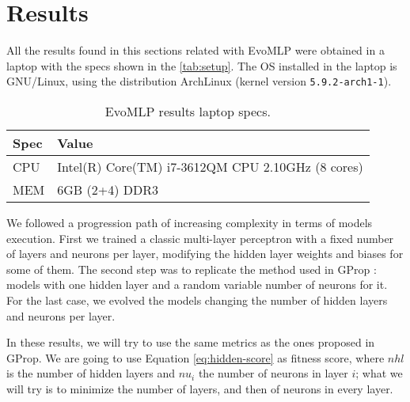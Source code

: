 \documentclass[runningheads]{llncs}
\begin{document}
\section{Results}
\label{sec:res}


All the results found in this sections related with {\sf EvoMLP}
\cite{deep-g-prop:anon} were obtained in a laptop with the specs shown in the
\autoref{tab:setup}. The OS installed in the laptop is GNU/Linux, using the
distribution ArchLinux (kernel version \texttt{5.9.2-arch1-1}).

\begin{table}[]
  \centering
  \caption{{\sf EvoMLP} results laptop specs.}
  \label{tab:setup}
  \begin{tabular}{|l|l|}
  \hline
    Spec & Value                                             \\ \hline
    CPU  & Intel(R) Core(TM) i7-3612QM CPU 2.10GHz (8 cores) \\ \hline
    MEM  & 6GB (2+4) DDR3                                    \\ \hline
  \end{tabular}
\end{table}

We followed a progression path of increasing complexity in terms of models
execution. First we trained a classic multi-layer perceptron with a fixed number
of layers and neurons per layer, modifying the hidden layer weights and biases
for some of them. The second step was to replicate the method used in GProp
\cite{castilloNC,CastilloNPL}: models with one hidden layer and a random
variable number of neurons for it. For the last case, we evolved the models
changing the number of hidden layers and neurons per layer.

In these results, we will try to use the same metrics as the ones
proposed in GProp. We are going to use Equation
\ref{eq:hidden-score} as fitness score, where $nhl$ is the number of
hidden layers and $nu_{i}$ the number of neurons in layer $i$; what we
will try is to minimize the number of layers, and then of neurons in
every layer.

\end{document}
